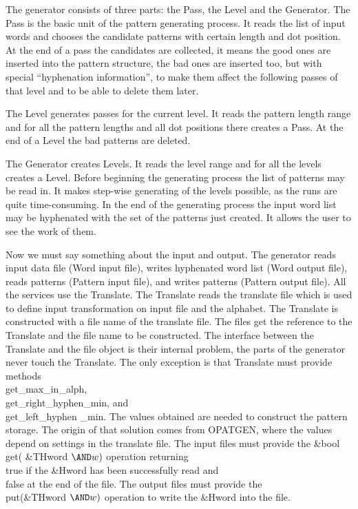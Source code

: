 \fi

The generator consists of three parts: the Pass, the Level and the
Generator. The Pass is the basic unit of the pattern generating process. It
reads the list of input words and chooses the candidate patterns with
certain length and dot position. At the end of a pass the candidates are
collected, it means the good ones are inserted into the pattern structure,
the bad ones are inserted too, but with special ``hyphenation
information'', to make them affect the following passes of that level and
to be able to delete them later.

The Level generates passes for the current level. It reads the pattern
length range and for all the pattern lengths and all dot positions there
creates a Pass. At the end of a Level the bad patterns are deleted.

The Generator creates Levels. It reads the level range and for all the
levels creates a Level. Before beginning the generating process the list of
patterns may be read in. It makes step-wise generating of the levels
possible, as the runs are quite time-consuming. In the end of the
generating process the input word list may be hyphenated with the set of
the patterns just created. It allows the user to see the work of them.

\fi

Now we must say something about the input and output. The generator reads
input data file (Word input file), writes hyphenated word list (Word output
file), reads patterns (Pattern input file), and writes patterns (Pattern
output file). All the services use the Translate. The Translate reads the
translate file which is used to define input transformation on input file
and the alphabet. The Translate is constructed with a file name of the
translate file. The files get the reference to the Translate and the file
name to be constructed. The interface between the Translate and the file
object is their internal problem, the parts of the generator never touch
the Translate. The only exception is that Translate must provide methods
\\{get\_max\_in\_alph}, \\{get\_right\_hyphen\_min}, and \\{get\_left\_hyphen%
\_min}. The
values obtained are needed to construct the pattern storage. The origin of
that solution comes from OPATGEN, where the values depend on settings in
the translate file. The input files must provide the \&{bool} \\{get}(%
\&{THword} ${}{\AND}\|w)$
operation returning \\{true} if the \&{Hword} has been successfully read and
\\{false} at the end of the file. The output files must provide the
\\{put}(\&{THword} ${}{\AND}\|w)$ operation to write the \&{Hword} into the
file.

